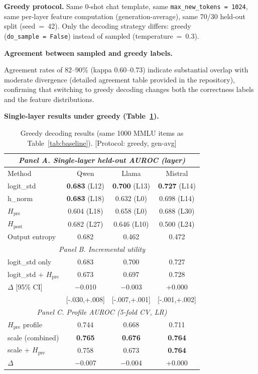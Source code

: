 \documentclass{ieeeaccess}
\newcommand{\Hpre}{H_{\text{pre}}}
\newcommand{\Hpost}{H_{\text{post}}}
\begin{document}
\textbf{Greedy protocol.} Same 0-shot chat template, same \texttt{max\_new\_tokens~=~1024}, same per-layer feature computation (generation-average), same 70/30 held-out split (seed~=~42). Only the decoding strategy differs: greedy (\texttt{do\_sample~=~False}) instead of sampled (temperature~=~0.3).

\textbf{Agreement between sampled and greedy labels.}

Agreement rates of 82--90\% (kappa 0.60--0.73) indicate substantial overlap with moderate divergence (detailed agreement table provided in the repository), confirming that switching to greedy decoding changes both the correctness labels and the feature distributions.

\textbf{Single-layer results under greedy (Table~\ref{tab:greedy}).}

\begin{table}[!ht]
\centering
\caption{Greedy decoding results (same 1000 MMLU items as Table~\ref{tab:baseline}). [Protocol: greedy, gen-avg]}
\label{tab:greedy}
\footnotesize
\setlength{\tabcolsep}{4pt}
\begin{tabular}{l ccc}
\toprule
\multicolumn{4}{c}{\textit{Panel A. Single-layer held-out AUROC (layer)}} \\
\midrule
Method & Qwen & Llama & Mistral \\
\midrule
logit\_std & \textbf{0.683} (L12) & \textbf{0.700} (L13) & \textbf{0.727} (L14) \\
h\_norm & \textbf{0.683} (L18) & 0.632 (L0) & 0.698 (L14) \\
$\Hpre$ & 0.604 (L18) & 0.658 (L0) & 0.688 (L30) \\
$\Hpost$ & 0.682 (L27) & 0.646 (L10) & 0.500 (L24) \\
Output entropy & 0.682 & 0.462 & 0.472 \\
\midrule
\multicolumn{4}{c}{\textit{Panel B. Incremental utility}} \\
\midrule
logit\_std only & 0.683 & 0.700 & 0.727 \\
logit\_std + $\Hpre$ & 0.673 & 0.697 & 0.728 \\
$\Delta$ [95\% CI] & $-$0.010 & $-$0.003 & +0.000 \\
 & [{-}.030,{+}.008] & [{-}.007,{+}.001] & [{-}.001,{+}.002] \\
\midrule
\multicolumn{4}{c}{\textit{Panel C. Profile AUROC (5-fold CV, LR)}} \\
\midrule
$\Hpre$ profile & 0.744 & 0.668 & 0.711 \\
scale (combined) & \textbf{0.765} & \textbf{0.676} & \textbf{0.764} \\
scale + $\Hpre$ & 0.758 & 0.673 & \textbf{0.764} \\
$\Delta$ & $-$0.007 & $-$0.004 & +0.000 \\
\bottomrule
\end{tabular}
\end{table}
\end{document}
